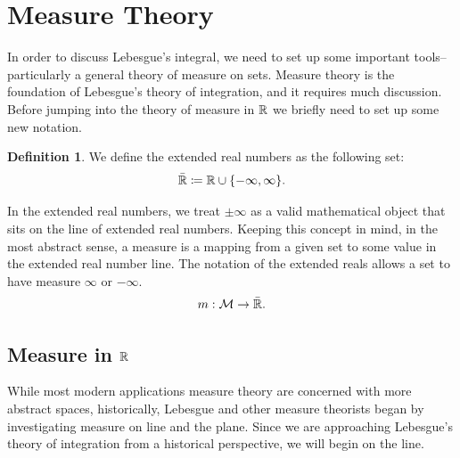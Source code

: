 \documentclass{article}
\theoremstyle{axiom} \newtheorem{axiom}{Axiom}
\theoremstyle{definition} \newtheorem{definition}{Definition}
\theoremstyle{example} \newtheorem{example}{Example}
\theoremstyle{proposition} \newtheorem{prop}{Proposition}
\theoremstyle{lemma} \newtheorem{lemma}{Lemma}
\newcommand{\sM}{\mathcal{M}}  \newcommand{\sN}{\mathcal{N}}
\begin{document}
\section{Measure Theory}

In order to discuss Lebesgue's integral, we need to set up some important
tools--particularly a general theory of measure on sets. Measure theory is the 
foundation of Lebesgue's theory of integration, and it requires much discussion.
Before jumping into the theory of measure in $\mathbb{R}$ we briefly need to set up some new
notation. 
\begin{definition}
	We define the extended real numbers as the following set:
	\begin{equation}
		\bar{\mathbb{R}} \coloneqq \mathbb{R} \cup \{-\infty,\infty\}.
	\end{equation}
\end{definition}
In the extended real numbers, we treat $\pm\infty$ as a valid mathematical object
that sits on the line of extended real numbers. Keeping this concept in mind, 
in the most abstract sense, a measure is a mapping from a given set to some value in 
the extended real number line. The notation of the extended reals allows a set
to have measure $\infty$ or $-\infty$.
\begin{equation*}
	m: \sM \rightarrow \bar \R.
\end{equation*}

\subsection{Measure in $\mathbb{R}$}

While most modern applications measure theory are concerned with more abstract spaces,
historically, Lebesgue and other measure theorists began by investigating
measure on line and the plane. Since we are approaching Lebesgue's theory of 
integration from a historical perspective, we will begin on the line.
\end{document}
